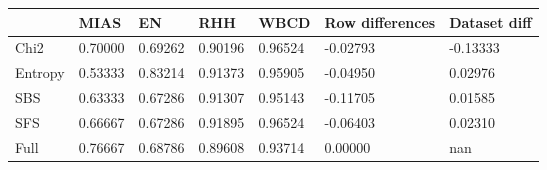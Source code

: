 \begin{tabular}{|l|l|l|l|l|l|l|}
\toprule
{} &    MIAS &      EN &     RHH &    WBCD & Row differences & Dataset diff \\
\midrule
Chi2    & 0.70000 & 0.69262 & 0.90196 & 0.96524 &        -0.02793 &     -0.13333 \\
Entropy & 0.53333 & 0.83214 & 0.91373 & 0.95905 &        -0.04950 &      0.02976 \\
SBS     & 0.63333 & 0.67286 & 0.91307 & 0.95143 &        -0.11705 &      0.01585 \\
SFS     & 0.66667 & 0.67286 & 0.91895 & 0.96524 &        -0.06403 &      0.02310 \\
Full    & 0.76667 & 0.68786 & 0.89608 & 0.93714 &         0.00000 &          nan \\
\bottomrule
\end{tabular}
